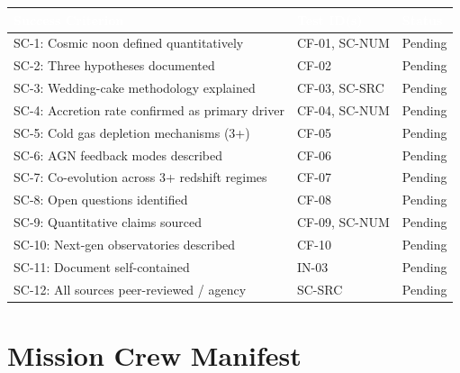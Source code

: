 \documentclass[11pt,letterpaper]{article}
\newcommand{\tableheader}[1]{\textbf{\sffamily\textcolor{white}{#1}}}
\begin{document}
\begin{center}
\begin{tabularx}{\textwidth}{XL{3.5cm}C{1.5cm}}
\toprule
{}
\tableheader{Success Criterion} & \tableheader{Test ID(s)} & \tableheader{Status} \\
\midrule
SC-1: Cosmic noon defined quantitatively & CF-01, SC-NUM & Pending \\
SC-2: Three hypotheses documented & CF-02 & Pending \\
SC-3: Wedding-cake methodology explained & CF-03, SC-SRC & Pending \\
SC-4: Accretion rate confirmed as primary driver & CF-04, SC-NUM & Pending \\
SC-5: Cold gas depletion mechanisms (3+) & CF-05 & Pending \\
SC-6: AGN feedback modes described & CF-06 & Pending \\
SC-7: Co-evolution across 3+ redshift regimes & CF-07 & Pending \\
SC-8: Open questions identified & CF-08 & Pending \\
SC-9: Quantitative claims sourced & CF-09, SC-NUM & Pending \\
SC-10: Next-gen observatories described & CF-10 & Pending \\
SC-11: Document self-contained & IN-03 & Pending \\
SC-12: All sources peer-reviewed / agency & SC-SRC & Pending \\
\bottomrule
\end{tabularx}
\end{center}

\section{Mission Crew Manifest}
\end{document}
